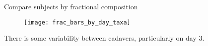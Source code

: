 \documentclass{beamer}
\begin{document}
\begin{frame}{Compare subjects by fractional composition}

\begin{center}
\begin{figure}
  \texttt{[image: frac\_bars\_by\_day\_taxa]}
\end{figure}
\end{center}
{\scriptsize  There is some variability between cadavers, particularly on day 3.}

\end{frame}







\end{document}
